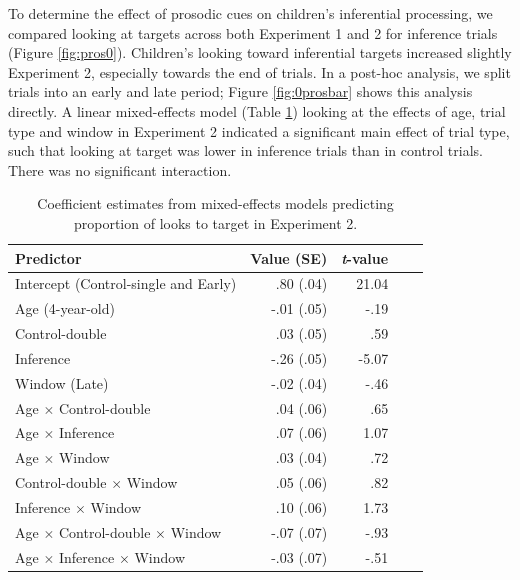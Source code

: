 \documentclass[10pt,letterpaper]{article}
\begin{document}
To determine the effect of prosodic cues on children's inferential processing, we compared looking at targets across both Experiment 1 and 2 for inference trials (Figure \ref{fig:pros0}). Children's looking toward inferential targets increased slightly Experiment 2, especially towards the end of trials. In a post-hoc analysis, we split trials into an early and late period; Figure \ref{fig:0prosbar} shows this analysis directly. A linear mixed-effects model (Table \ref{tab:lmer3}) looking at the effects of age, trial type and window in Experiment 2 indicated a significant main effect of trial type, such that looking at target was lower in inference trials than in control trials. There was no significant interaction.

\begin{table}[b!]
\caption{\label{tab:lmer3}  Coefficient estimates from mixed-effects models predicting proportion of looks to target in Experiment 2.} 
\begin{center} 
\begin{tabular}{l r r r l} 
\hline
Predictor  &  Value (SE) & \emph{t}-value\\
\hline
Intercept (Control-single and Early)  & .80 (.04) & 21.04 \\
Age (4-year-old) & -.01 (.05) &  -.19 \\
Control-double & .03 (.05) & .59 \\
Inference & -.26 (.05) & -5.07 \\
Window (Late) & -.02 (.04) & -.46 \\
Age $\times$  Control-double & .04 (.06) & .65 \\
Age $\times$  Inference & .07 (.06) & 1.07 \\
Age $\times$  Window & .03 (.04) & .72 \\
Control-double $\times$  Window & .05 (.06) & .82 \\
Inference $\times$ Window & .10 (.06) & 1.73 \\
Age $\times$ Control-double $\times$ Window & -.07 (.07) & -.93 \\
Age $\times$ Inference $\times$ Window & -.03 (.07) & -.51 \\
\hline
\end{tabular} 
\end{center} 
\end{table}
\end{document}
